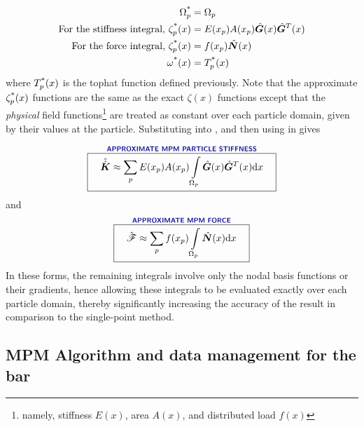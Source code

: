 \begin{subequations}
\begin{align}
  \Omega_p^{\text{*}} &= \Omega_p
\\
 \text{For the stiffness integral, }  \zeta_p^{\text{*}}(x)&=E(x_p)A(x_p)\hat{\bm{G}}(x)\hat{\bm{G}}^T(x)
\\
 \text{For the force integral, }  \zeta_p^{\text{*}}(x)&=f(x_p)\hat{\bm{N}}(x)
\\
  \omega^{\text{*}}(x) &=T_p^{\text{*}}(x)
\end{align}
\label{eq:GIMPChoices}
\end{subequations}
where $T_p^{\text{*}}(x)$ is the tophat function defined previously.  Note that the approximate $\zeta_p^{\text{*}}(x)$ functions are the same as the exact $\zeta(x)$ functions except that the \textit{physical} field functions\footnote{namely, stiffness $E(x)$, area $A(x)$, and distributed load $f(x)$} are treated as constant over each particle domain, given by their values at the particle. Substituting  into , and then using  in  gives


\begin{equation}
\overset{\text{\Defn{APPROXIMATE MPM PARTICLE STIFFNESS}}}{\boxit{\quad
  \AArray{K}
\approx
  \sum\limits_p E(x_p)A(x_p)\int\limits_{\Omega_p} \gradNBFa(x)\gradNBFa^T(x) \dd x
\quad}}
\label{eq:LinearBarStiffnessIntegral}
\end{equation}
and
\begin{equation}
\overset{\text{\Defn{APPROXIMATE MPM FORCE}}}{\boxit{\quad
  \Array{\tractionForce}
\approx
  \sum\limits_p f(x_p)\int\limits_{\Omega_p} \NBFa(x) \dd x
\quad}}
\label{eq:LinearBarForceIntegral}
\end{equation}
In these forms, the remaining integrals involve only the nodal basis functions or their gradients, hence allowing these integrals to be evaluated exactly over each particle domain, thereby significantly increasing the accuracy of the result in comparison to the single-point method.


\subsection{MPM Algorithm and data management for the \oneD bar}

